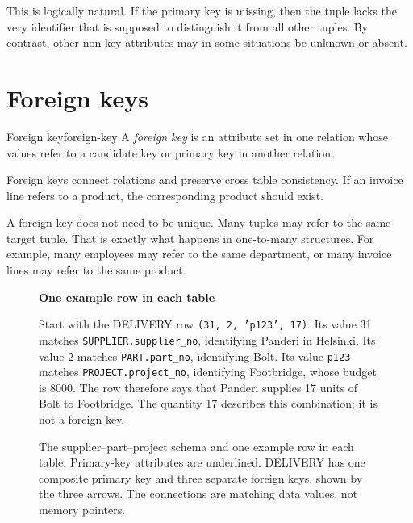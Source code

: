 \documentclass[11pt,a4paper,openany]{book}
\begin{document}
This is logically natural. If the primary key is missing, then the tuple lacks the very identifier that is supposed to distinguish it from all other tuples. By contrast, other non-key attributes may in some situations be unknown or absent.

\section{Foreign keys}
\begin{definition}{Foreign key}{foreign-key}
A \emph{foreign key} is an attribute set in one relation whose values refer to a candidate key or primary key in another relation.
\end{definition}

Foreign keys connect relations and preserve cross table consistency. If an invoice line refers to a product, the corresponding product should exist.

A foreign key does not need to be unique. Many tuples may refer to the same target tuple. That is exactly what happens in one-to-many structures. For example, many employees may refer to the same department, or many invoice lines may refer to the same product.

\begin{figure}[tbp]
\centering

\par\medskip
\textbf{One example row in each table}\par\smallskip

\par\medskip
\begin{minipage}{\linewidth}
\small
Start with the DELIVERY row \texttt{(31, 2, 'p123', 17)}. Its value 31 matches
\texttt{SUPPLIER.supplier\_no}, identifying Panderi in Helsinki. Its value 2
matches \texttt{PART.part\_no}, identifying Bolt. Its value \texttt{p123}
matches \texttt{PROJECT.project\_no}, identifying Footbridge, whose budget is 8000.
The row therefore says that Panderi supplies 17 units of Bolt to Footbridge.
The quantity 17 describes this combination; it is not a foreign key.
\end{minipage}
\caption{The supplier--part--project schema and one example row in each table.
Primary-key attributes are underlined. DELIVERY has one composite primary key
and three separate foreign keys, shown by the three arrows. The connections
are matching data values, not memory pointers.}
\label{fig:rel-delivery-schema}
\end{figure}
\end{document}
